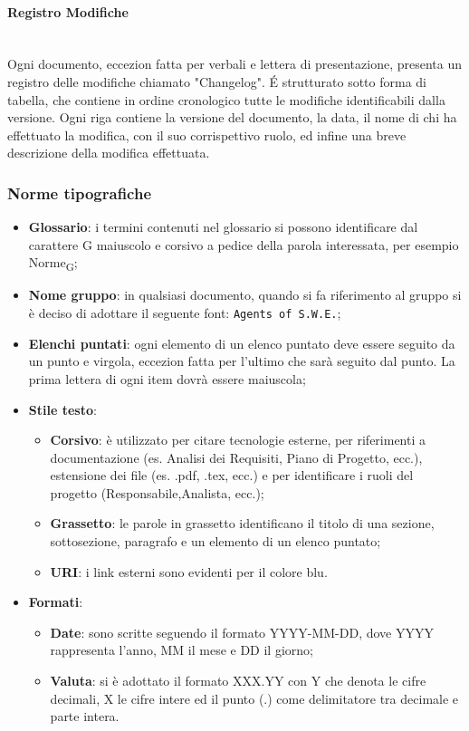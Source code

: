 \paragraph{Registro Modifiche} \-\\
Ogni documento, eccezion fatta per verbali e lettera di presentazione, presenta un registro delle modifiche chiamato "Changelog". \'E strutturato sotto forma di tabella, che contiene in ordine cronologico tutte le modifiche identificabili dalla versione.  Ogni riga contiene la versione del documento, la data, il nome di chi ha effettuato la modifica, con il suo corrispettivo ruolo, ed infine una breve descrizione della modifica effettuata.


\subsubsection{Norme tipografiche}
\begin{itemize}
	\item \textbf{Glossario}: i termini contenuti nel glossario si possono identificare dal carattere G maiuscolo e corsivo a pedice della parola interessata, per esempio Norme\textsubscript{G};	 		
	\item \textbf{Nome gruppo}: in qualsiasi documento, quando si fa riferimento al gruppo si è deciso di adottare il seguente font: \texttt{Agents of S.W.E.};
	\item \textbf{Elenchi puntati}: ogni elemento di un elenco puntato deve essere seguito da un punto e virgola, eccezion fatta per l'ultimo che sarà seguito dal punto. La prima lettera di ogni item dovrà essere maiuscola;
	\item \textbf{Stile testo}:
	\begin{itemize}
		\item \textbf{Corsivo}: è utilizzato per citare tecnologie esterne, per riferimenti a documentazione (es. Analisi dei Requisiti, Piano di Progetto, ecc.), estensione dei file (es. .pdf, .tex, ecc.) e per identificare i ruoli del progetto (Responsabile,Analista, ecc.);	
		\item \textbf{Grassetto}: le parole in grassetto identificano il titolo di una sezione, sottosezione, paragrafo e un elemento di un elenco puntato;
		\item \textbf{URI}:	i link esterni sono evidenti per il colore blu.
	\end{itemize}
	\item \textbf{Formati}:
	\begin{itemize}
		\item \textbf{Date}: sono scritte seguendo il formato YYYY-MM-DD, dove YYYY rappresenta l'anno, MM il mese e DD il giorno;
		\item \textbf{Valuta}: si è adottato il formato XXX.YY con Y che denota le cifre decimali, X le cifre intere ed il punto (.) come delimitatore tra decimale e parte intera.
	\end{itemize}
\end{itemize}


